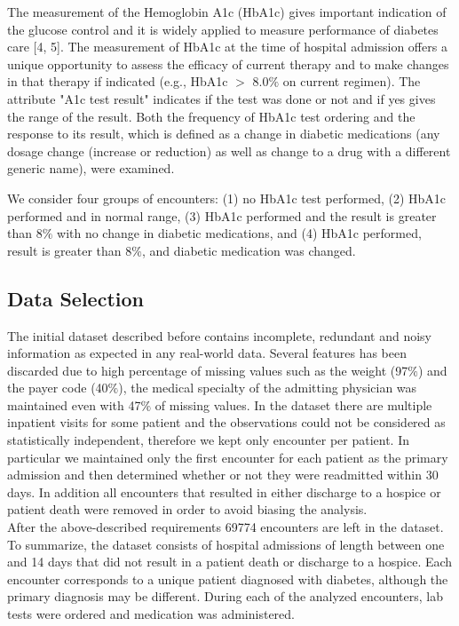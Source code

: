 \documentclass[12pt]{article}
\begin{document}
The measurement of the Hemoglobin A1c (HbA1c) gives important indication of the glucose control and it is widely applied to measure performance of diabetes care [4, 5]. The measurement of HbA1c at the time of hospital admission offers a unique opportunity to assess the efficacy of current therapy and to make changes in that therapy if indicated (e.g., HbA1c $>$ 8.0$\%$ on current regimen).
The attribute "A1c test result" indicates if the test was done or not and if yes gives the range of the result. 
Both the frequency of HbA1c test ordering and the response to its result, which is defined as a change in diabetic medications (any dosage change (increase or reduction) as well as change to a drug with a different generic name), were examined. 

We consider four groups of encounters: (1) no HbA1c test performed, (2) HbA1c performed and in normal range, (3) HbA1c performed and the result is greater than 8$\%$ with no change in diabetic medications, and (4) HbA1c performed, result is greater than 8$\%$, and diabetic medication was changed.

\subsection{Data Selection}

The initial dataset described before contains incomplete, redundant and noisy information as expected in any real-world data. Several features has been discarded due to high percentage of missing values such as the weight (97$\%$) and the payer code (40$\%$), the medical specialty of the admitting physician was maintained even with 47$\%$ of missing values.
In the dataset there are multiple inpatient visits for some patient and the observations could not be considered as statistically independent, therefore we kept only encounter per patient. In particular we maintained only the first encounter for each patient as the primary admission and then determined whether or not they were readmitted within 30 days.
In addition all encounters that resulted in either discharge to a hospice or patient death were removed in order to avoid biasing the analysis. \\
After the above-described requirements 69774 encounters are left in the dataset. To summarize, the dataset consists of hospital admissions of length between one and 14 days that did not result in a patient death or discharge to a hospice. Each encounter corresponds to a unique patient diagnosed with diabetes, although the primary diagnosis may be different. During each of the analyzed encounters, lab tests were ordered and medication was administered.
\end{document}
